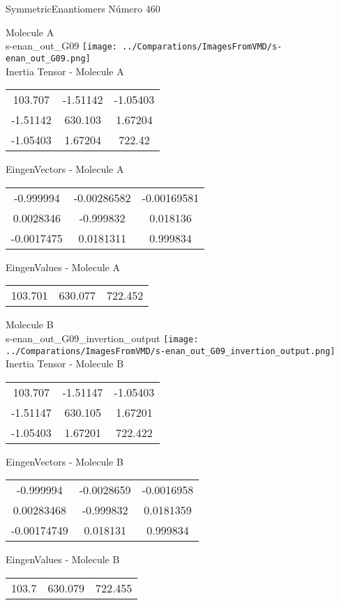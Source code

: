 \vtab[-2cm]
\begin{center}
{\large SymmetricEnantiomers \tab Número 460}
\end{center}
\begin{multicols}{2}
\begin{center}

Molecule A \\ 
s-enan\_out\_G09
\texttt{[image: ../Comparations/ImagesFromVMD/s-enan\_out\_G09.png]}
\\
Inertia Tensor - Molecule A \\
\vtab

\begin{tabular}{|c c c|}
103.707	 & 	-1.51142	 & 	-1.05403	 \\
-1.51142	 & 	630.103	 & 	1.67204	 \\
-1.05403	 & 	1.67204	 & 	722.42
\end{tabular}

\vtab
 EingenVectors - Molecule A     \\
\vtab
\begin{tabular}{|c c c|}
-0.999994	 & 	-0.00286582	 & 	-0.00169581	 \\
0.0028346	 & 	-0.999832	 & 	0.018136	 \\
-0.0017475	 & 	0.0181311	 & 	0.999834
\end{tabular}

\vtab
 EingenValues - Molecule A     \\
\vtab
\begin{tabular}{|c c c|}
103.701	 & 	630.077	 & 	722.452	 \\
\end{tabular}
\columnbreak

Molecule B \\ 
s-enan\_out\_G09\_invertion\_output
\texttt{[image: ../Comparations/ImagesFromVMD/s-enan\_out\_G09\_invertion\_output.png]}
\\
Inertia Tensor - Molecule B \\
\vtab

\begin{tabular}{|c c c|}
103.707	 & 	-1.51147	 & 	-1.05403	 \\
-1.51147	 & 	630.105	 & 	1.67201	 \\
-1.05403	 & 	1.67201	 & 	722.422
\end{tabular}

\vtab
 EingenVectors - Molecule B     \\
\vtab
\begin{tabular}{|c c c|}
-0.999994	 & 	-0.0028659	 & 	-0.0016958	 \\
0.00283468	 & 	-0.999832	 & 	0.0181359	 \\
-0.00174749	 & 	0.018131	 & 	0.999834
\end{tabular}

\vtab
 EingenValues - Molecule B     \\
\vtab
\begin{tabular}{|c c c|}
103.7	 & 	630.079	 & 	722.455	 \\
\end{tabular}

\end{center}
\end{multicols}
